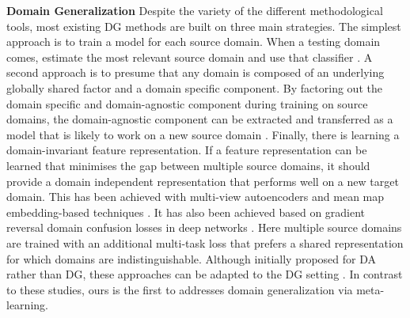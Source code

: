 \documentclass[letterpaper]{article} \usepackage{aaai18}  \usepackage{times}  \usepackage{helvet}  \usepackage{courier}  \usepackage{url}  \usepackage{graphicx}  \usepackage{amsmath}
\newcommand{\keypoint}[1]{\vspace{0.1cm}\noindent\textbf{#1}\quad}
\begin{document}
\keypoint{Domain Generalization} Despite the variety of the different methodological tools, most existing DG methods are built on three main strategies. The simplest approach is to train a model for each source domain. When a testing domain comes, estimate the most relevant source domain and use that classifier \cite{xu2014lowRankLatentDomain}. A second approach is to presume that any domain is composed of an underlying globally shared factor and a domain specific component. By factoring out the domain specific and domain-agnostic component during training on source domains, the domain-agnostic component can be extracted and transferred as a model that is likely to work on a new source domain \cite{khosla2012undoing,da2017dg}. Finally, there is learning a domain-invariant feature representation. If a feature representation can be learned that minimises the gap between multiple source domains, it should provide a domain independent representation that performs well on a new target domain. This has been achieved with multi-view autoencoders 
\cite{ghifary2015domain} and mean map embedding-based techniques \cite{muandet2013domain}. It has also been achieved based on gradient reversal domain confusion losses in deep networks \cite{ganin2015unsupervised,bousmalis2016domain}. Here multiple source domains are trained with an additional multi-task loss that prefers a shared representation for which domains are indistinguishable. Although initially proposed for DA rather than DG, these approaches can be adapted to the DG setting \cite{da2017dg}. In contrast to these studies, ours is the first to addresses domain generalization via meta-learning.
\end{document}

